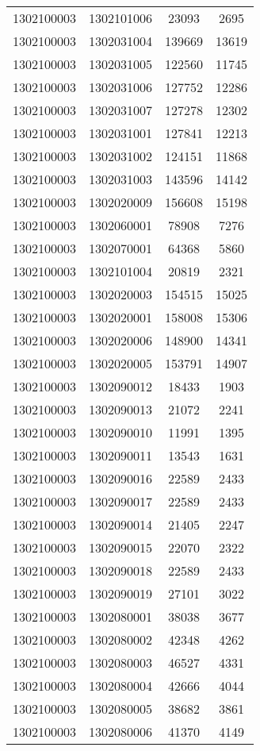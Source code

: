 \begin{longtable}[h]{llcc}
		1302100003 & 1302101006 & 23093 & 2695\\
		1302100003 & 1302031004 & 139669 & 13619\\
		1302100003 & 1302031005 & 122560 & 11745\\
		1302100003 & 1302031006 & 127752 & 12286\\
		1302100003 & 1302031007 & 127278 & 12302\\
		1302100003 & 1302031001 & 127841 & 12213\\
		1302100003 & 1302031002 & 124151 & 11868\\
		1302100003 & 1302031003 & 143596 & 14142\\
		1302100003 & 1302020009 & 156608 & 15198\\
		1302100003 & 1302060001 & 78908 & 7276\\
		1302100003 & 1302070001 & 64368 & 5860\\
		1302100003 & 1302101004 & 20819 & 2321\\
		1302100003 & 1302020003 & 154515 & 15025\\
		1302100003 & 1302020001 & 158008 & 15306\\
		1302100003 & 1302020006 & 148900 & 14341\\
		1302100003 & 1302020005 & 153791 & 14907\\
		1302100003 & 1302090012 & 18433 & 1903\\
		1302100003 & 1302090013 & 21072 & 2241\\
		1302100003 & 1302090010 & 11991 & 1395\\
		1302100003 & 1302090011 & 13543 & 1631\\
		1302100003 & 1302090016 & 22589 & 2433\\
		1302100003 & 1302090017 & 22589 & 2433\\
		1302100003 & 1302090014 & 21405 & 2247\\
		1302100003 & 1302090015 & 22070 & 2322\\
		1302100003 & 1302090018 & 22589 & 2433\\
		1302100003 & 1302090019 & 27101 & 3022\\
		1302100003 & 1302080001 & 38038 & 3677\\
		1302100003 & 1302080002 & 42348 & 4262\\
		1302100003 & 1302080003 & 46527 & 4331\\
		1302100003 & 1302080004 & 42666 & 4044\\
		1302100003 & 1302080005 & 38682 & 3861\\
		1302100003 & 1302080006 & 41370 & 4149\\

\end{longtable}
